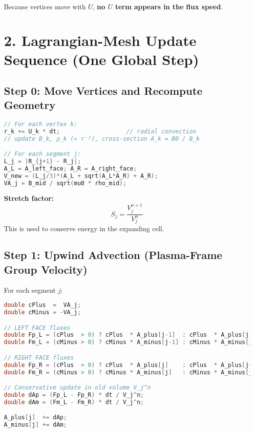\noindent Because vertices move with $U$, \textbf{no $U$ term appears in the flux speed}.

\section*{2. Lagrangian-Mesh Update Sequence (One Global Step)}

\subsection*{Step 0: Move Vertices and Recompute Geometry}

\begin{lstlisting}[language=C++,basicstyle=\ttfamily\footnotesize]
// For each vertex k:
r_k += U_k * dt;                   // radial convection
// update B_k, ρ_k (∝ r⁻²), cross-section A_k = B0 / B_k

// For each segment j:
L_j = |R_{j+1} - R_j|;
A_L = A_left_face; A_R = A_right_face;
V_new = (L_j/3)*(A_L + sqrt(A_L*A_R) + A_R);
VA_j = B_mid / sqrt(mu0 * rho_mid);
\end{lstlisting}

\noindent \textbf{Stretch factor:}
\[
S_j = \frac{V_j^{n+1}}{V_j^n}
\]
This is used to conserve energy in the expanding cell.

\subsection*{Step 1: Upwind Advection (Plasma-Frame Group Velocity)}

For each segment $j$:

\begin{lstlisting}[language=C++,basicstyle=\ttfamily\footnotesize]
double cPlus  =  VA_j;
double cMinus = -VA_j;

// LEFT FACE fluxes
double Fp_L = (cPlus  > 0) ? cPlus  * A_plus[j-1]  : cPlus  * A_plus[j];
double Fm_L = (cMinus > 0) ? cMinus * A_minus[j-1] : cMinus * A_minus[j];

// RIGHT FACE fluxes
double Fp_R = (cPlus  > 0) ? cPlus  * A_plus[j]    : cPlus  * A_plus[j+1];
double Fm_R = (cMinus > 0) ? cMinus * A_minus[j]   : cMinus * A_minus[j+1];

// Conservative update in old volume V_j^n
double dAp = (Fp_L - Fp_R) * dt / V_j^n;
double dAm = (Fm_L - Fm_R) * dt / V_j^n;

A_plus[j]  += dAp;
A_minus[j] += dAm;
\end{lstlisting}


